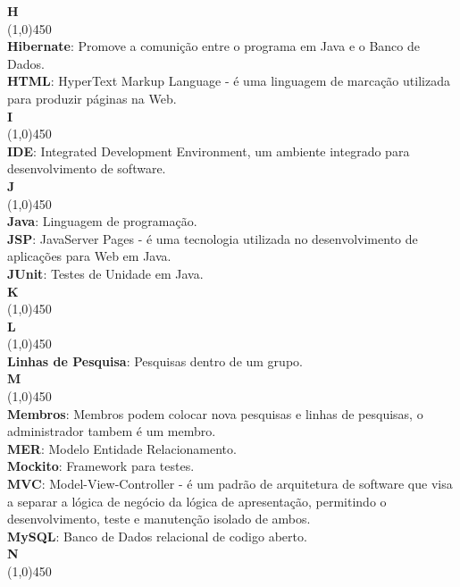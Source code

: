 \documentclass[11pt, a4paper]{article}
\begin{document}
	\noindent\textbf{\huge{H}}\\
	\line(1,0){450}\\
	\textbf{Hibernate}: Promove a comunição entre o programa em Java e o Banco 
	de Dados.\\
	\textbf{HTML}: HyperText Markup Language - é uma linguagem de marcação 
	utilizada para produzir páginas na Web.\\
	
	\noindent\textbf{\huge{I}}\\
	\line(1,0){450}\\
	\textbf{IDE}: Integrated Development Environment, um ambiente integrado 
	para desenvolvimento de software.\\
	
	\noindent\textbf{\huge{J}}\\
	\line(1,0){450}\\
	\textbf{Java}: Linguagem de programação.\\
	\textbf{JSP}: JavaServer Pages - é uma tecnologia utilizada no 
	desenvolvimento de aplicações para Web em Java.\\
	\textbf{JUnit}: Testes de Unidade em Java.\\
	
	\noindent\textbf{\huge{K}}\\
	\line(1,0){450}\\
		
	\noindent\textbf{\huge{L}}\\
	\line(1,0){450}\\
	\textbf{Linhas de Pesquisa}: Pesquisas dentro de um grupo.\\
		
	\noindent\textbf{\huge{M}}\\
	\line(1,0){450}\\
	\textbf{Membros}: Membros podem colocar nova pesquisas e linhas de pesquisas, 
	o administrador tambem é um membro.\\
	\textbf{MER}: Modelo Entidade Relacionamento.\\
	\textbf{Mockito}: Framework para testes.\\
	\textbf{MVC}: Model-View-Controller - é um padrão de arquitetura de software
	que visa a separar a lógica de negócio da lógica de apresentação, permitindo
	o desenvolvimento, teste e manutenção isolado de ambos.\\
	\textbf{MySQL}: Banco de Dados relacional de codigo aberto.\\
			
	\noindent\textbf{\huge{N}}\\
	\line(1,0){450}\\
	
\end{document}
